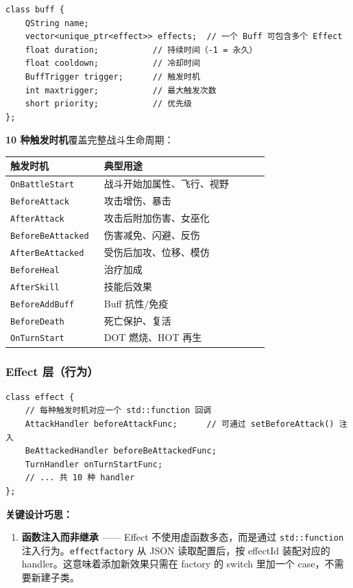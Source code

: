 \documentclass[UTF8,10pt]{ctexart}
\begin{document}
\begin{lstlisting}
class buff {
    QString name;
    vector<unique_ptr<effect>> effects;  // 一个 Buff 可包含多个 Effect
    float duration;           // 持续时间（-1 = 永久）
    float cooldown;           // 冷却时间
    BuffTrigger trigger;      // 触发时机
    int maxtrigger;           // 最大触发次数
    short priority;           // 优先级
};
\end{lstlisting}

\textbf{10 种触发时机}覆盖完整战斗生命周期：

{\small
\begin{longtable}{p{0.34\linewidth}p{0.60\linewidth}}
\toprule
\textbf{触发时机} & \textbf{典型用途} \\
\midrule
\texttt{OnBattleStart} & 战斗开始加属性、飞行、视野 \\
\texttt{BeforeAttack} & 攻击增伤、暴击 \\
\texttt{AfterAttack} & 攻击后附加伤害、女巫化 \\
\texttt{BeforeBeAttacked} & 伤害减免、闪避、反伤 \\
\texttt{AfterBeAttacked} & 受伤后加攻、位移、模仿 \\
\texttt{BeforeHeal} & 治疗加成 \\
\texttt{AfterSkill} & 技能后效果 \\
\texttt{BeforeAddBuff} & Buff 抗性/免疫 \\
\texttt{BeforeDeath} & 死亡保护、复活 \\
\texttt{OnTurnStart} & DOT 燃烧、HOT 再生 \\
\bottomrule
\end{longtable}
}

\subsubsection*{Effect 层（行为）}

\begin{lstlisting}
class effect {
    // 每种触发时机对应一个 std::function 回调
    AttackHandler beforeAttackFunc;      // 可通过 setBeforeAttack() 注入
    BeAttackedHandler beforeBeAttackedFunc;
    TurnHandler onTurnStartFunc;
    // ... 共 10 种 handler
};
\end{lstlisting}

\textbf{关键设计巧思：}

\begin{enumerate}
\item \textbf{函数注入而非继承} —— Effect 不使用虚函数多态，而是通过 \texttt{std::function} 注入行为。\texttt{effectfactory} 从 JSON 读取配置后，按 effectId 装配对应的 handler。这意味着添加新效果只需在 factory 的 switch 里加一个 case，不需要新建子类。
\end{enumerate}
\end{document}
